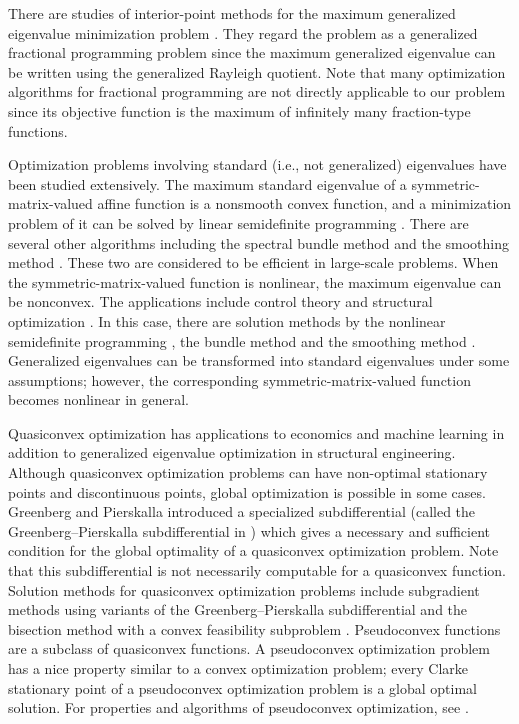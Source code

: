 \documentclass[sn-mathphys,Numbered]{sn-jnl}%
\theoremstyle{thmstyleone}%
\theoremstyle{thmstyletwo}%
\theoremstyle{thmstylethree}%
\begin{document}
There are studies of interior-point methods for the maximum generalized eigenvalue minimization problem \cite{boyd93,nesterov95}. They regard the problem as a generalized fractional programming problem since the maximum generalized eigenvalue can be written using the generalized Rayleigh quotient. Note that many optimization algorithms \cite{bot17,crouzeix91} for fractional programming are not directly applicable to our problem since its objective function is the maximum of infinitely many fraction-type functions.

Optimization problems involving standard (i.e., not generalized) eigenvalues have been studied extensively. The maximum standard eigenvalue of a symmetric-matrix-valued affine function is a nonsmooth convex function, and a minimization problem of it can be solved by linear semidefinite programming \cite{lewis96}. There are several other algorithms including the spectral bundle method \cite{helmberg00} and the smoothing method \cite{nesterov07}. These two are considered to be efficient in large-scale problems. When the symmetric-matrix-valued function is nonlinear, the maximum eigenvalue can be nonconvex. The applications include control theory \cite{lv15} and structural optimization \cite{takezawa11}. In this case, there are solution methods by the nonlinear semidefinite programming \cite{holmberg15}, the bundle method \cite{apkarian08} and the smoothing method \cite{nishioka23smao}. Generalized eigenvalues can be transformed into standard eigenvalues under some assumptions; however, the corresponding symmetric-matrix-valued function becomes nonlinear in general.

Quasiconvex optimization has applications to economics \cite{hu15} and machine learning \cite{hazan15} in addition to generalized eigenvalue optimization in structural engineering. Although quasiconvex optimization problems can have non-optimal stationary points and discontinuous points, global optimization is possible in some cases. Greenberg and Pierskalla \cite{greenberg73} introduced a specialized subdifferential (called the Greenberg--Pierskalla subdifferential in \cite{hu15}) which gives a necessary and sufficient condition for the global optimality of a quasiconvex optimization problem. Note that this subdifferential is not necessarily computable for a quasiconvex function. Solution methods for quasiconvex optimization problems include subgradient methods using variants of the Greenberg--Pierskalla subdifferential \cite{kiwiel01,hu15,yang22} and the bisection method with a convex feasibility subproblem \cite{boyd04}. Pseudoconvex functions are a subclass of quasiconvex functions. A pseudoconvex optimization problem has a nice property similar to a convex optimization problem; every Clarke stationary point of a pseudoconvex optimization problem is a global optimal solution. For properties and algorithms of pseudoconvex optimization, see \cite{bian18,soleimani07}.
\end{document}
